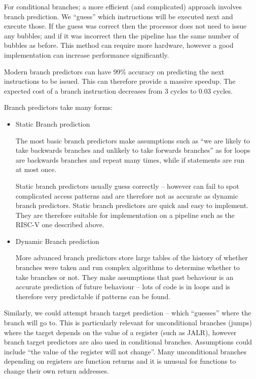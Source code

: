 \documentclass[10pt,\jkfside,a4paper]{article}
\begin{document}
\begin{enumerate}
For conditional branches; a more efficient (and complicated) approach involves
branch prediction. We ``guess'' which instructions will be executed next and
execute those. If the guess was correct then the processor does not need to
issue any bubbles; and if it was incorrect then the pipeline has the same
number of bubbles as before. This method can require more hardware, however
a good implementation can increase performance significantly.

Modern branch predictors can have 99\% accuracy on predicting the next
instructions to be issued. This can therefore provide a massive speedup. The
expected cost of a branch instruction decreases from 3 cycles to 0.03
cycles.

Branch predictors take many forms:

\begin{itemize}

\item Static Branch prediction

The most basic branch predictors make assumptions such as ``we are likely to
take backwards branches and unlikely to take forwards branches'' as for
loops are backwards branches and repeat many times, while if statements are
run at most once.

Static branch predictors usually guess correctly -- however can fail to spot
complicated access patterns and are therefore not as accurate as dynamic
branch predictors. Static branch predictors are quick and easy to implement.
They are therefore suitable for implementation on a pipeline such as the
RISC-V one described above.

\item Dynamic Branch prediction

More advanced branch predictors store large tables of the history of whether
branches were taken and run complex algorithms to determine whether to take
branches or not. They make assumptions that past behaviour is an accurate
prediction of future behaviour -- lots of code is in loops and is therefore
very predictable if patterns can be found.

\end{itemize}

Similarly, we could attempt branch target prediction -- which ``guesses''
where the branch will go to. This is particularly relevant for unconditional
branches (jumps) where the target depends on the value of a register (such as
JALR), however branch target predictors are also used in conditional branches.
Assumptions could include ``the value of the register will not change''.
Many unconditional branches depending on registers are function returns and it
is unusual for functions to change their own return addresses.


\end{enumerate}
\end{document}
